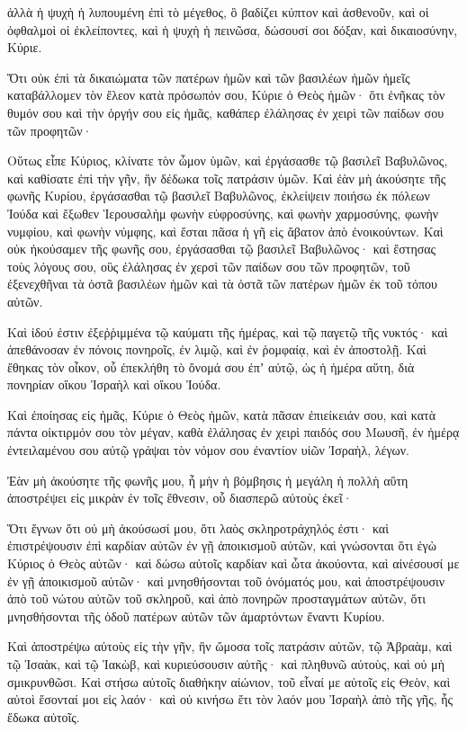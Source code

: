 {ἀλλὰ ἡ ψυχὴ ἡ λυπουμένη ἐπὶ τὸ μέγεθος, ὃ βαδίζει κύπτον καὶ ἀσθενοῦν, καὶ οἱ ὀφθαλμοὶ οἱ ἐκλείποντες, καὶ ἡ ψυχὴ ἡ πεινῶσα, δώσουσί σοι δόξαν, καὶ δικαιοσύνην, Κύριε.
\par }{\PP {}Ὅτι οὐκ ἐπὶ τὰ δικαιώματα τῶν πατέρων ἡμῶν καὶ τῶν βασιλέων ἡμῶν ἡμεῖς καταβάλλομεν τὸν ἔλεον κατὰ πρόσωπόν σου, Κύριε ὁ Θεὸς ἡμῶν·
ὅτι ἐνῆκας τὸν θυμόν σου καὶ τὴν ὀργήν σου εἰς ἡμᾶς, καθάπερ ἐλάλησας ἐν χειρὶ τῶν παίδων σου τῶν προφητῶν·
\par }{\PP {}Οὕτως εἶπε Κύριος, κλίνατε τὸν ὦμον ὑμῶν, καὶ ἐργάσασθε τῷ βασιλεῖ Βαβυλῶνος, καὶ καθίσατε ἐπὶ τὴν γῆν, ἣν δέδωκα τοῖς πατράσιν ὑμῶν.
Καὶ ἐὰν μὴ ἀκούσητε τῆς φωνῆς Κυρίου, ἐργάσασθαι τῷ βασιλεῖ Βαβυλῶνος,
ἐκλείψειν ποιήσω ἐκ πόλεων Ἰούδα καὶ ἔξωθεν Ἱερουσαλὴμ φωνὴν εὐφροσύνης, καὶ φωνὴν χαρμοσύνης, φωνὴν νυμφίου, καὶ φωνὴν νύμφης, καὶ ἔσται πᾶσα ἡ γῆ εἰς ἄβατον ἀπὸ ἐνοικούντων.
Καὶ οὐκ ἠκούσαμεν τῆς φωνῆς σου, ἐργάσασθαι τῷ βασιλεῖ Βαβυλῶνος· καὶ ἔστησας τοὺς λόγους σου, οὓς ἐλάλησας ἐν χερσὶ τῶν παίδων σου τῶν προφητῶν, τοῦ ἐξενεχθῆναι τὰ ὀστᾶ βασιλέων ἡμῶν καὶ τὰ ὀστᾶ τῶν πατέρων ἡμῶν ἐκ τοῦ τόπου αὐτῶν.
\par }{\PP {}Καὶ ἰδού ἐστιν ἐξεῤῥιμμένα τῷ καύματι τῆς ἡμέρας, καὶ τῷ παγετῷ τῆς νυκτός· καὶ ἀπεθάνοσαν ἐν πόνοις πονηροῖς, ἐν λιμῷ, καὶ ἐν ῥομφαίᾳ, καὶ ἐν ἀποστολῇ.
Καὶ ἔθηκας τὸν οἶκον, οὗ ἐπεκλήθη τὸ ὄνομά σου ἐπʼ αὐτῷ, ὡς ἡ ἡμέρα αὕτη, διὰ πονηρίαν οἴκου Ἰσραὴλ καὶ οἴκου Ἰούδα.
\par }{\PP {}Καὶ ἐποίησας εἰς ἡμᾶς, Κύριε ὁ Θεὸς ἡμῶν, κατὰ πᾶσαν ἐπιείκειάν σου, καὶ κατὰ πάντα οἰκτιρμόν σου τὸν μέγαν,
καθὰ ἐλάλησας ἐν χειρὶ παιδός σου Μωυσῆ, ἐν ἡμέρᾳ ἐντειλαμένου σου αὐτῷ γράψαι τὸν νόμον σου ἐναντίον υἱῶν Ἰσραὴλ, λέγων.
\par }{\PP {}Ἐὰν μὴ ἀκούσητε τῆς φωνῆς μου, ἦ μὴν ἡ βόμβησις ἡ μεγάλη ἡ πολλὴ αὕτη ἀποστρέψει εἰς μικρὰν ἐν τοῖς ἔθνεσιν, οὗ διασπερῶ αὐτοὺς ἐκεῖ·
\par }{\PP {}Ὅτι ἔγνων ὅτι οὐ μὴ ἀκούσωσί μου, ὅτι λαὸς σκληροτράχηλός ἐστι· καὶ ἐπιστρέψουσιν ἐπὶ καρδίαν αὐτῶν ἐν γῇ ἀποικισμοῦ αὐτῶν,
καὶ γνώσονται ὅτι ἐγὼ Κύριος ὁ Θεὸς αὐτῶν· καὶ δώσω αὐτοῖς καρδίαν καὶ ὦτα ἀκούοντα,
καὶ αἰνέσουσί με ἐν γῇ ἀποικισμοῦ αὐτῶν· καὶ μνησθήσονται τοῦ ὀνόματός μου,
καὶ ἀποστρέψουσιν ἀπὸ τοῦ νώτου αὐτῶν τοῦ σκληροῦ, καὶ ἀπὸ πονηρῶν προσταγμάτων αὐτῶν, ὅτι μνησθήσονται τῆς ὁδοῦ πατέρων αὐτῶν τῶν ἁμαρτόντων ἔναντι Κυρίου.
\par }{\PP {}Καὶ ἀποστρέψω αὐτοὺς εἰς τὴν γῆν, ἣν ὤμοσα τοῖς πατράσιν αὐτῶν, τῷ Ἁβραὰμ, καὶ τῷ Ἰσαὰκ, καὶ τῷ Ἰακὼβ, καὶ κυριεύσουσιν αὐτῆς· καὶ πληθυνῶ αὐτοὺς, καὶ οὐ μὴ σμικρυνθῶσι.
Καὶ στήσω αὐτοῖς διαθήκην αἰώνιον, τοῦ εἶναί με αὐτοῖς εἰς Θεὸν, καὶ αὐτοὶ ἔσονταί μοι εἰς λαόν· καὶ οὐ κινήσω ἔτι τὸν λαόν μου Ἰσραὴλ ἀπὸ τῆς γῆς, ἧς ἔδωκα αὐτοῖς.

}
